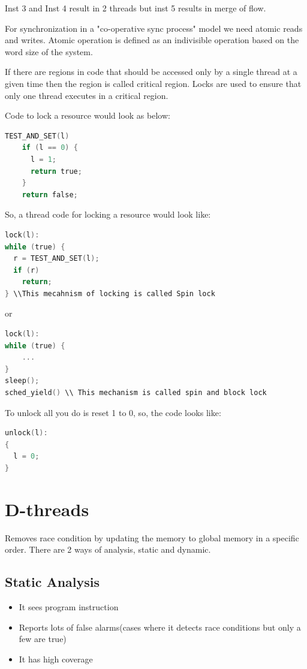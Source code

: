 \documentclass[twoside]{article}
\begin{document}
Inst 3 and Inst 4 result in 2 threads but inst 5 results in merge of flow.

For synchronization in a "co-operative sync process" model we need atomic reads and writes. Atomic operation is defined as an indivisible operation based on the word size of the system.

If there are regions in code that should be accessed only by a single thread at a given time then the region is called critical region. Locks are used to ensure that only one thread executes in a critical region. 

Code to lock a resource would look as below:

\begin{lstlisting}[language=C]
	TEST_AND_SET(l)
	if (l == 0) {
	  l = 1;
	  return true;
	}
	return false;
\end{lstlisting}

So, a thread code for locking a resource would look like:

\begin{lstlisting}[language=C]
lock(l):
while (true) {
  r = TEST_AND_SET(l);
  if (r)
    return;
} \\This mecahnism of locking is called Spin lock
\end{lstlisting}

or

\begin{lstlisting}[language=C]
lock(l):
while (true) {
	...
} 
sleep();
sched_yield() \\ This mechanism is called spin and block lock

\end{lstlisting}



To unlock all you do is reset 1 to 0, so, the code looks like:

\begin{lstlisting}[language=C]
unlock(l):
{
  l = 0;
}
\end{lstlisting}

\section{D-threads}

Removes race condition by updating the memory to global memory in a specific order. There are 2 ways of analysis, static and dynamic.

\subsection{Static Analysis}
\begin{itemize}
	\item It sees program instruction
	\item Reports lots of false alarms(cases where it detects race conditions but only a few are true)
	\item It has high coverage
\end{itemize}
\end{document}
